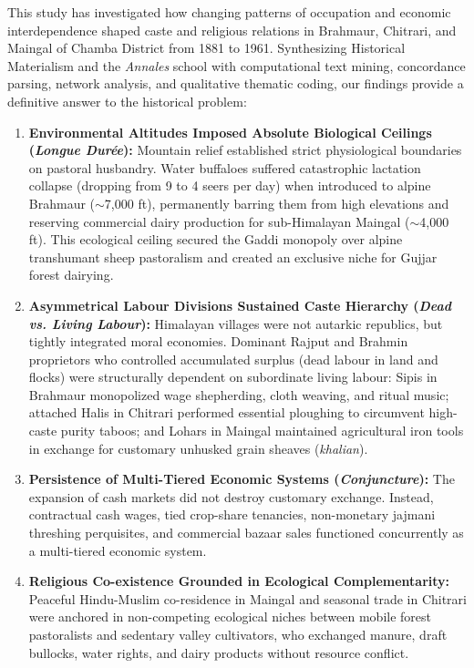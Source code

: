 \documentclass[11pt,a4paper]{article}
\begin{document}
This study has investigated how changing patterns of occupation and economic interdependence shaped caste and religious relations in Brahmaur, Chitrari, and Maingal of Chamba District from 1881 to 1961. Synthesizing Historical Materialism and the \textit{Annales} school with computational text mining, concordance parsing, network analysis, and qualitative thematic coding, our findings provide a definitive answer to the historical problem:
\begin{enumerate}[leftmargin=*]
    \item \textbf{Environmental Altitudes Imposed Absolute Biological Ceilings (\textit{Longue Dur\'ee}):} Mountain relief established strict physiological boundaries on pastoral husbandry. Water buffaloes suffered catastrophic lactation collapse (dropping from 9 to 4 seers per day) when introduced to alpine Brahmaur ($\sim$7,000 ft), permanently barring them from high elevations and reserving commercial dairy production for sub-Himalayan Maingal ($\sim$4,000 ft). This ecological ceiling secured the Gaddi monopoly over alpine transhumant sheep pastoralism and created an exclusive niche for Gujjar forest dairying.
    \item \textbf{Asymmetrical Labour Divisions Sustained Caste Hierarchy (\textit{Dead vs. Living Labour}):} Himalayan villages were not autarkic republics, but tightly integrated moral economies. Dominant Rajput and Brahmin proprietors who controlled accumulated surplus (dead labour in land and flocks) were structurally dependent on subordinate living labour: Sipis in Brahmaur monopolized wage shepherding, cloth weaving, and ritual music; attached Halis in Chitrari performed essential ploughing to circumvent high-caste purity taboos; and Lohars in Maingal maintained agricultural iron tools in exchange for customary unhusked grain sheaves (\textit{khalian}).
    \item \textbf{Persistence of Multi-Tiered Economic Systems (\textit{Conjuncture}):} The expansion of cash markets did not destroy customary exchange. Instead, contractual cash wages, tied crop-share tenancies, non-monetary jajmani threshing perquisites, and commercial bazaar sales functioned concurrently as a multi-tiered economic system.
    \item \textbf{Religious Co-existence Grounded in Ecological Complementarity:} Peaceful Hindu-Muslim co-residence in Maingal and seasonal trade in Chitrari were anchored in non-competing ecological niches between mobile forest pastoralists and sedentary valley cultivators, who exchanged manure, draft bullocks, water rights, and dairy products without resource conflict.
\end{enumerate}
\end{document}

